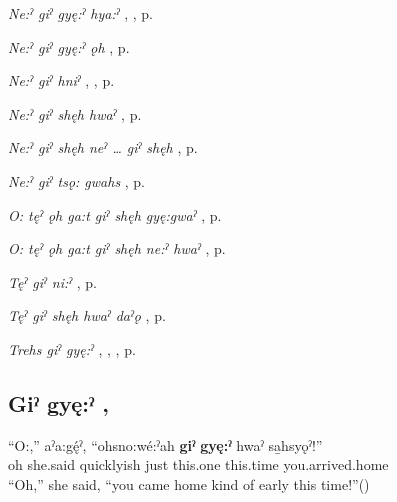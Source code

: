 \begin{CayugaRelated}
\item \textit{Ne:ˀ giˀ gyę:ˀ hya:ˀ} , , p. \pageref{p:[ne:ˀ giˀ gyę:ˀ hya:ˀ]}\\
\item \textit{Ne:ˀ giˀ gyę:ˀ ǫh} , p. \pageref{p:[ne:ˀ giˀ gyę:ˀ ǫh]}\\
\item \textit{Ne:ˀ giˀ hniˀ} , , p. \pageref{p:[ne:ˀ giˀ hniˀ]}\\
\item \textit{Ne:ˀ giˀ shęh hwaˀ} , p. \pageref{p:[ne:ˀ giˀ shęh hwaˀ]}\\
\item \textit{Ne:ˀ giˀ shęh neˀ … giˀ shęh} , p. \pageref{p:[ne:ˀ giˀ shęh neˀ … giˀ shęh]}\\
\item \textit{Ne:ˀ giˀ tsǫ: gwahs} , p. \pageref{p:[ne:ˀ giˀ tsǫ: gwahs]}\\
\item \textit{O: tęˀ ǫh ga:t giˀ shęh gyę:gwaˀ} , p. \pageref{p:[o: tęˀ ǫh ga:t giˀ shęh gyę:gwaˀ]}\\
\item \textit{O: tęˀ ǫh ga:t giˀ shęh ne:ˀ hwaˀ} , p. \pageref{p:[o: tęˀ ǫh ga:t giˀ shęh ne:ˀ hwaˀ]}\\
\item \textit{Tęˀ giˀ ni:ˀ} , p. \pageref{p:[tęˀ giˀ ni:ˀ]}\\
\item \textit{Tęˀ giˀ shęh hwaˀ daˀǫ} , p. \pageref{p:[tęˀ giˀ shęh hwaˀ daˀǫ]}\\
\item \textit{Trehs giˀ gyę:ˀ} , , , p. \pageref{p:[trehs giˀ gyę:ˀ]}
\end{CayugaRelated}

\subsection*{\textbf{Giˀ gyę:ˀ} , } \label{p:[giˀ gyę:ˀ] ‘quite’}

\ea
\label{ex:gpar74}
\gll “O:,” aˀa:gę́ˀ, “ohsno:wé:ˀah  \textbf{giˀ} \textbf{gyę:ˀ} hwaˀ sa̱hsyǫˀ!”\\
oh she.said quicklyish just this.one this.time you.arrived.home\\
\glt “Oh,” she said, “you came home kind of early this time!”(\cite{henry_de_2005})
\z

